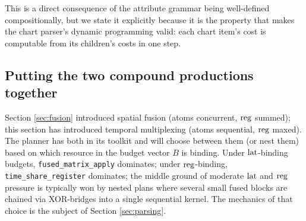 This is a direct consequence of the attribute grammar
being well-defined compositionally, but we state it
explicitly because it is the property that makes the
chart parser's dynamic programming valid: each chart
item's cost is computable from its children's costs
in one step.

\subsection{Putting the two compound productions together}

Section \ref{sec:fusion} introduced spatial fusion
(atoms concurrent, $\operatorname{reg}$ summed); this section has
introduced temporal multiplexing (atoms sequential,
$\operatorname{reg}$ maxed). The planner has both in its toolkit
and will choose between them (or nest them) based on
which resource in the budget vector $B$ is binding.
Under $\operatorname{lat}$-binding budgets, \texttt{fused\_matrix\_apply}
dominates; under $\operatorname{reg}$-binding,
\texttt{time\_share\_register} dominates; the middle
ground of moderate $\operatorname{lat}$ and $\operatorname{reg}$ pressure is
typically won by nested plans where several small
fused blocks are chained via XOR-bridges into a
single sequential kernel. The mechanics of that
choice is the subject of Section \ref{sec:parsing}.
